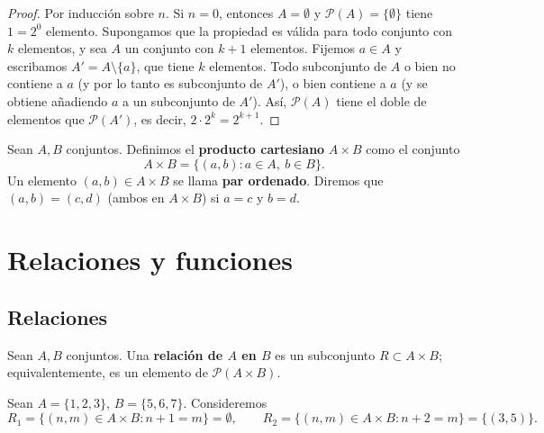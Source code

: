 \documentclass[12pt,a4paper]{book}
\begin{document}
    \begin{proof}
        Por inducción sobre $n$. Si $n=0$, entonces $A=\emptyset$ y $\mathcal{P}(A)=\{\emptyset\}$ tiene $1=2^0$ elemento. Supongamos que la propiedad es válida para todo conjunto con $k$ elementos, y sea $A$ un conjunto con $k+1$ elementos. Fijemos $a\in A$ y escribamos $A' = A\setminus\{a\}$, que tiene $k$ elementos. Todo subconjunto de $A$ o bien no contiene a $a$ (y por lo tanto es subconjunto de $A'$), o bien contiene a $a$ (y se obtiene añadiendo $a$ a un subconjunto de $A'$). Así, $\mathcal{P}(A)$ tiene el doble de elementos que $\mathcal{P}(A')$, es decir, $2\cdot 2^k = 2^{k+1}$.
    \end{proof}

    \begin{definicion}
        Sean $A,B$ conjuntos. Definimos el \textbf{producto cartesiano} $A\times B$ como el conjunto
        \begin{equation*}
            A\times B = \{(a,b) : a\in A,\ b\in B\}.
        \end{equation*}
        Un elemento $(a,b)\in A\times B$ se llama \textbf{par ordenado}. Diremos que $(a,b)=(c,d)$ (ambos en $A\times B$) si $a=c$ y $b=d$.
    \end{definicion}

    \chapter{Relaciones y funciones}

    \section{Relaciones}

    \begin{definicion}[Relación]
        Sean $A,B$ conjuntos. Una \textbf{relación de $A$ en $B$} es un subconjunto $R\subset A\times B$; equivalentemente, es un elemento de $\mathcal{P}(A\times B)$.
    \end{definicion}

    \begin{ejemplo}
        Sean $A=\{1,2,3\}$, $B=\{5,6,7\}$. Consideremos
        \begin{equation*}
            R_1 = \{(n,m)\in A\times B : n+1=m\} = \emptyset, \qquad R_2 = \{(n,m)\in A\times B : n+2=m\} = \{(3,5)\}.
        \end{equation*}
    \end{ejemplo}
\end{document}
